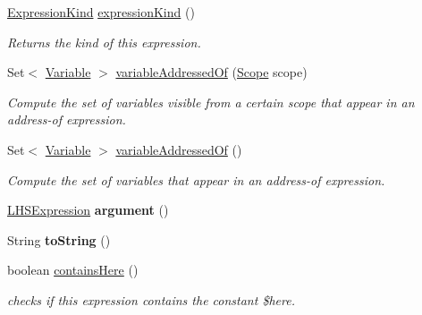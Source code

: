 \begin{DoxyCompactItemize}
\item 
\hyperlink{enumedu_1_1udel_1_1cis_1_1vsl_1_1civl_1_1model_1_1IF_1_1expression_1_1Expression_1_1ExpressionKind}{Expression\+Kind} \hyperlink{classedu_1_1udel_1_1cis_1_1vsl_1_1civl_1_1model_1_1common_1_1expression_1_1CommonScopeofExpression_ac6e127fcb20073f8eb7f0ecebd964ab1}{expression\+Kind} ()
\begin{DoxyCompactList}\small\item\em Returns the kind of this expression. \end{DoxyCompactList}\item 
Set$<$ \hyperlink{interfaceedu_1_1udel_1_1cis_1_1vsl_1_1civl_1_1model_1_1IF_1_1variable_1_1Variable}{Variable} $>$ \hyperlink{classedu_1_1udel_1_1cis_1_1vsl_1_1civl_1_1model_1_1common_1_1expression_1_1CommonScopeofExpression_ab8c3fba53e548c801bdb1ea7c935cd03}{variable\+Addressed\+Of} (\hyperlink{interfaceedu_1_1udel_1_1cis_1_1vsl_1_1civl_1_1model_1_1IF_1_1Scope}{Scope} scope)
\begin{DoxyCompactList}\small\item\em Compute the set of variables visible from a certain scope that appear in an address-\/of expression. \end{DoxyCompactList}\item 
Set$<$ \hyperlink{interfaceedu_1_1udel_1_1cis_1_1vsl_1_1civl_1_1model_1_1IF_1_1variable_1_1Variable}{Variable} $>$ \hyperlink{classedu_1_1udel_1_1cis_1_1vsl_1_1civl_1_1model_1_1common_1_1expression_1_1CommonScopeofExpression_aece4953e76fdab9580fc3d8242f6d952}{variable\+Addressed\+Of} ()
\begin{DoxyCompactList}\small\item\em Compute the set of variables that appear in an address-\/of expression. \end{DoxyCompactList}\item 
\hypertarget{classedu_1_1udel_1_1cis_1_1vsl_1_1civl_1_1model_1_1common_1_1expression_1_1CommonScopeofExpression_ad8fd89d9fa163f724dc6be61d25e51d8}{}\hyperlink{interfaceedu_1_1udel_1_1cis_1_1vsl_1_1civl_1_1model_1_1IF_1_1expression_1_1LHSExpression}{L\+H\+S\+Expression} {\bfseries argument} ()\label{classedu_1_1udel_1_1cis_1_1vsl_1_1civl_1_1model_1_1common_1_1expression_1_1CommonScopeofExpression_ad8fd89d9fa163f724dc6be61d25e51d8}

\item 
\hypertarget{classedu_1_1udel_1_1cis_1_1vsl_1_1civl_1_1model_1_1common_1_1expression_1_1CommonScopeofExpression_aa8badcacd48617b5ef3f6ed567c16c9b}{}String {\bfseries to\+String} ()\label{classedu_1_1udel_1_1cis_1_1vsl_1_1civl_1_1model_1_1common_1_1expression_1_1CommonScopeofExpression_aa8badcacd48617b5ef3f6ed567c16c9b}

\item 
boolean \hyperlink{classedu_1_1udel_1_1cis_1_1vsl_1_1civl_1_1model_1_1common_1_1expression_1_1CommonScopeofExpression_a7ba5101412339703ce3a7af907b07451}{contains\+Here} ()
\begin{DoxyCompactList}\small\item\em checks if this expression contains the constant \$here. \end{DoxyCompactList}\end{DoxyCompactItemize}
